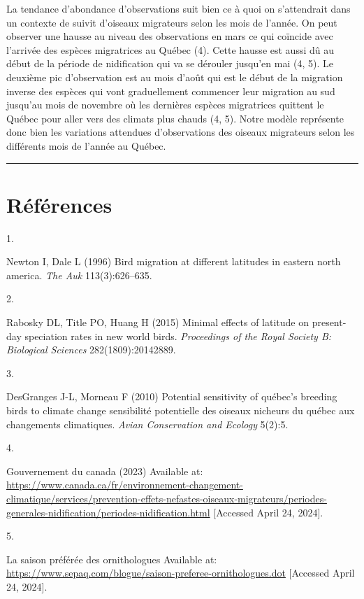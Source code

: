 \documentclass[9pt,twocolumn,twoside,]{pnas-new}
\newlength{\cslhangindent}
\newlength{\csllabelwidth}
\newlength{\cslentryspacingunit} %
\newenvironment{CSLReferences}[2] %
 {%
  \setlength{\parindent}{0pt}
  \ifodd #1
  \let\oldpar\par
  \def\par{\hangindent=\cslhangindent\oldpar}
  \fi
  \setlength{\parskip}{#2\cslentryspacingunit}
 }%
 {}
\newcommand{\CSLLeftMargin}[1]{\parbox[t]{\csllabelwidth}{#1}}
\newcommand{\CSLRightInline}[1]{\parbox[t]{\linewidth - \csllabelwidth}{#1}\break}
\begin{document}
La tendance d'abondance d'observations suit bien ce à quoi on
s'attendrait dans un contexte de suivit d'oiseaux migrateurs selon les
mois de l'année. On peut observer une hausse au niveau des observations
en mars ce qui coïncide avec l'arrivée des espèces migratrices au Québec
(4). Cette hausse est aussi dû au début de la période de nidification
qui va se dérouler jusqu'en mai (4, 5). Le deuxième pic d'observation
est au mois d'août qui est le début de la migration inverse des espèces
qui vont graduellement commencer leur migration au sud jusqu'au mois de
novembre où les dernières espèces migratrices quittent le Québec pour
aller vers des climats plus chauds (4, 5). Notre modèle représente donc
bien les variations attendues d'observations des oiseaux migrateurs
selon les différents mois de l'année au Québec.

\begin{center}\rule{0.5\linewidth}{0.5pt}\end{center}

\showmatmethods

\hypertarget{references}{%
\section*{Références}\label{references}}

\pnasbreak

\hypertarget{refs}{}
\begin{CSLReferences}{0}{0}
\leavevmode{}%
\CSLLeftMargin{1. }%
\CSLRightInline{Newton I, Dale L (1996) Bird migration at different
latitudes in eastern north america. \emph{The Auk} 113(3):626--635.}

\leavevmode{}%
\CSLLeftMargin{2. }%
\CSLRightInline{Rabosky DL, Title PO, Huang H (2015) Minimal effects of
latitude on present-day speciation rates in new world birds.
\emph{Proceedings of the Royal Society B: Biological Sciences}
282(1809):20142889.}

\leavevmode{}%
\CSLLeftMargin{3. }%
\CSLRightInline{DesGranges J-L, Morneau F (2010) Potential sensitivity
of qu{é}bec's breeding birds to climate change sensibilit{é} potentielle
des oiseaux nicheurs du qu{é}bec aux changements climatiques.
\emph{Avian Conservation and Ecology} 5(2):5.}

\leavevmode{}%
\CSLLeftMargin{4. }%
\CSLRightInline{Gouvernement du canada (2023) Available at:
\url{https://www.canada.ca/fr/environnement-changement-climatique/services/prevention-effets-nefastes-oiseaux-migrateurs/periodes-generales-nidification/periodes-nidification.html}
{[}Accessed April 24, 2024{]}.}

\leavevmode{}%
\CSLLeftMargin{5. }%
\CSLRightInline{La saison préférée des ornithologues Available at:
\url{https://www.sepaq.com/blogue/saison-preferee-ornithologues.dot}
{[}Accessed April 24, 2024{]}.}

\end{CSLReferences}



% 
\end{document}
